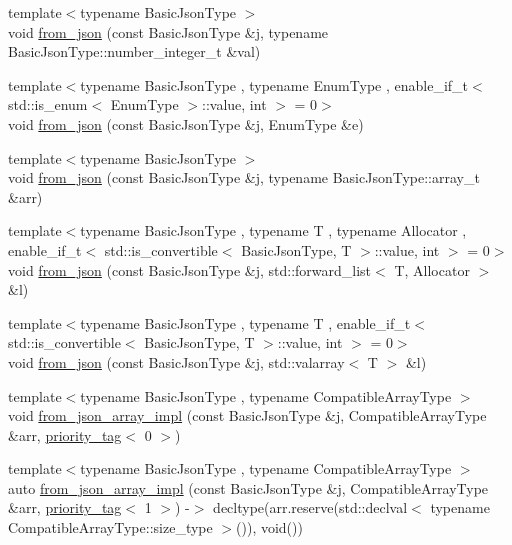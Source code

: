 \begin{DoxyCompactItemize}
\item 
{\footnotesize template$<$typename Basic\+Json\+Type $>$ }\\void \hyperlink{namespacenlohmann_1_1detail_a047d881e611fcac709dc318f730a1732}{from\+\_\+json} (const Basic\+Json\+Type \&j, typename Basic\+Json\+Type\+::number\+\_\+integer\+\_\+t \&val)
\item 
{\footnotesize template$<$typename Basic\+Json\+Type , typename Enum\+Type , enable\+\_\+if\+\_\+t$<$ std\+::is\+\_\+enum$<$ Enum\+Type $>$\+::value, int $>$  = 0$>$ }\\void \hyperlink{namespacenlohmann_1_1detail_a5440d650150d01e8015133521351b459}{from\+\_\+json} (const Basic\+Json\+Type \&j, Enum\+Type \&e)
\item 
{\footnotesize template$<$typename Basic\+Json\+Type $>$ }\\void \hyperlink{namespacenlohmann_1_1detail_abc62958462b916726b89f25fa381a129}{from\+\_\+json} (const Basic\+Json\+Type \&j, typename Basic\+Json\+Type\+::array\+\_\+t \&arr)
\item 
{\footnotesize template$<$typename Basic\+Json\+Type , typename T , typename Allocator , enable\+\_\+if\+\_\+t$<$ std\+::is\+\_\+convertible$<$ Basic\+Json\+Type, T $>$\+::value, int $>$  = 0$>$ }\\void \hyperlink{namespacenlohmann_1_1detail_a5cfb765aad92795abd7fda29d017272a}{from\+\_\+json} (const Basic\+Json\+Type \&j, std\+::forward\+\_\+list$<$ T, Allocator $>$ \&l)
\item 
{\footnotesize template$<$typename Basic\+Json\+Type , typename T , enable\+\_\+if\+\_\+t$<$ std\+::is\+\_\+convertible$<$ Basic\+Json\+Type, T $>$\+::value, int $>$  = 0$>$ }\\void \hyperlink{namespacenlohmann_1_1detail_a3df497b1d3977f071b488ecac1401517}{from\+\_\+json} (const Basic\+Json\+Type \&j, std\+::valarray$<$ T $>$ \&l)
\item 
{\footnotesize template$<$typename Basic\+Json\+Type , typename Compatible\+Array\+Type $>$ }\\void \hyperlink{namespacenlohmann_1_1detail_ac53673a5ce29fb69b96d41dad33cb3b0}{from\+\_\+json\+\_\+array\+\_\+impl} (const Basic\+Json\+Type \&j, Compatible\+Array\+Type \&arr, \hyperlink{structnlohmann_1_1detail_1_1priority__tag}{priority\+\_\+tag}$<$ 0 $>$)
\item 
{\footnotesize template$<$typename Basic\+Json\+Type , typename Compatible\+Array\+Type $>$ }\\auto \hyperlink{namespacenlohmann_1_1detail_a57f93ed57254a1639087cdc316e0fb83}{from\+\_\+json\+\_\+array\+\_\+impl} (const Basic\+Json\+Type \&j, Compatible\+Array\+Type \&arr, \hyperlink{structnlohmann_1_1detail_1_1priority__tag}{priority\+\_\+tag}$<$ 1 $>$) -\/$>$ decltype(arr.\+reserve(std\+::declval$<$ typename Compatible\+Array\+Type\+::size\+\_\+type $>$()), void())

\end{DoxyCompactItemize}
